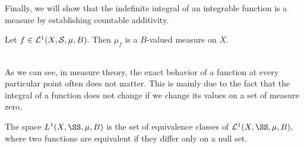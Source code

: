 \noindent Finally, we will show that the indefinite integral of an integrable function is a measure by establishing countable additivity.

\begin{prop}
Let $f\in\mathcal{L}^1(X,\mathcal{S},\mu,B).$ Then $\mu_f$ is a $B$-valued measure on $X.$ \\ \\
\end{prop}

As we can see, in measure theory, the exact behavior of a function at every particular point often does not matter. This is mainly due to the fact that the integral of a function does not change if we change its values on a set of measure zero.

\begin{defn}
The space $L^1(X,\SS,\mu, B)$ is the set of equivalence classes of $\mathcal{L}^1(X,\SS,\mu, B),$ where two functions are equivalent if they differ only on a null set.
\end{defn}